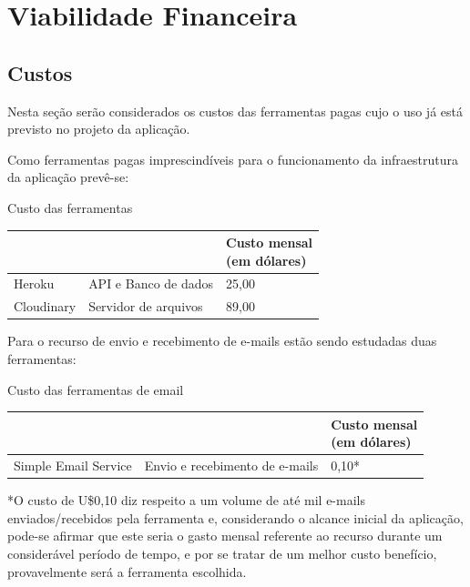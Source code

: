 \section{Viabilidade Financeira}
\subsection{Custos}
Nesta seção serão considerados os custos das ferramentas pagas cujo o uso já está previsto no projeto da aplicação. 

Como ferramentas pagas imprescindíveis para o funcionamento da infraestrutura da aplicação prevê-se:

\begin{quadro}[htb]
	\centering
	\ABNTEXfontereduzida
	\caption[Custo das ferramentas]{Custo das ferramentas}
	\label{quadro-exemplo}
	\begin{tabular}{|p{4.0cm}|p{4.0cm}|p{3.0cm}|}
		\hline
		\thead{Ferramenta} & \thead{Uso}  & \thead{Custo mensal\\(em dólares)} \\
		\hline
		Heroku & API e Banco de dados  & 25,00  \\
		\hline
		Cloudinary & Servidor de arquivos &
		89,00 \\
		\hline
	\end{tabular}
\end{quadro}

Para o recurso de envio e recebimento de e-mails estão sendo estudadas duas ferramentas: 

\begin{quadro}[htb]
	\centering
	\ABNTEXfontereduzida
	\caption[Custo das ferramentas de email]{Custo das ferramentas de email}
	\label{quadro-exemplo}
	\begin{tabular}{|p{4.0cm}|p{4.0cm}|p{3.0cm}|}
		\hline
		\thead{Ferramenta} & \thead{Uso}  & \thead{Custo mensal\\(em dólares)} \\
		\hline
		Simple Email Service & Envio e recebimento de e-mails & 0,10*\\
		\hline
	\end{tabular}
\end{quadro}

*O custo de U\$0,10 diz respeito a um volume de até mil e-mails enviados/recebidos pela ferramenta e, considerando o alcance inicial da aplicação, pode-se afirmar que este seria o gasto mensal referente ao recurso durante um considerável período de tempo, e por se tratar de um melhor custo benefício, provavelmente será a ferramenta escolhida. 

